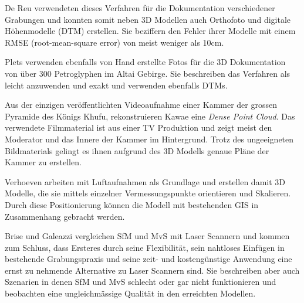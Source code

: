 			De Reu \etal{} verwendeten dieses Verfahren für die Dokumentation verschiedener Grabungen und konnten somit neben 3D Modellen auch Orthofoto und digitale Höhenmodelle (DTM) erstellen. Sie beziffern den Fehler ihrer Modelle mit einem RMSE (root-mean-square error) von meist weniger als 10cm.
			
			Plets \etal{} verwenden ebenfalls von Hand erstellte Fotos für die 3D Dokumentation von über 300 Petroglyphen im Altai Gebirge. Sie beschreiben das Verfahren als leicht anzuwenden und exakt und verwenden ebenfalls DTMs.
			
			Aus der einzigen veröffentlichten Videoaufnahme einer Kammer der grossen Pyramide des Königs Khufu, rekonstruieren Kawae \etal{} eine \emph{Dense Point Cloud}. Das verwendete Filmmaterial ist aus einer TV Produktion und zeigt meist den Moderator und das Innere der Kammer im Hintergrund. Trotz des ungeeigneten Bildmaterials gelingt es ihnen aufgrund des 3D Modells genaue Pläne der Kammer zu erstellen.
			
			Verhoeven \etal{} arbeiten mit Luftaufnahmen als Grundlage und erstellen damit 3D Modelle, die sie mittels einzelner Vermessungspunkte orientieren und Skalieren. Durch diese Positionierung können die Modell mit bestehenden GIS in Zusammenhang gebracht werden.
			
			Brise \etal{} und Galeazzi \etal{} vergleichen SfM und MvS mit Laser Scannern und kommen zum Schluss, dass Ersteres durch seine Flexibilität, sein nahtloses Einfügen in bestehende Grabungspraxis und seine zeit- und kostengünstige Anwendung eine ernst zu nehmende Alternative zu Laser Scannern sind. Sie beschreiben aber auch Szenarien in denen SfM und MvS schlecht oder gar nicht funktionieren und beobachten eine ungleichmässige Qualität in den erreichten Modellen.